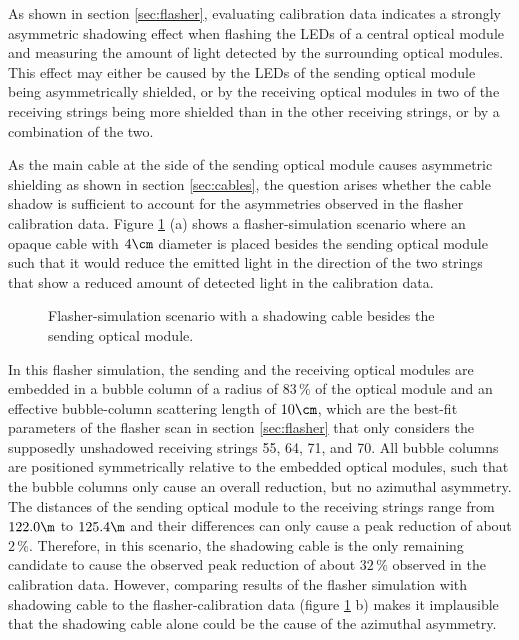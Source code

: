 As shown in section \ref{sec:flasher}, evaluating calibration data indicates a strongly asymmetric shadowing effect when flashing the LEDs of a central optical module and measuring the amount of light detected by the surrounding optical modules. This effect may either be caused by the LEDs of the sending optical module being asymmetrically shielded, or by the receiving optical modules in two of the receiving strings being more shielded than in the other receiving strings, or by a combination of the two.

As the main cable at the side of the sending optical module causes asymmetric shielding as shown in section \ref{sec:cables}, the question arises whether the cable shadow is sufficient to account for the asymmetries observed in the flasher calibration data. Figure \ref{fig:neen7Noo} (a) shows a flasher-simulation scenario where an opaque cable with $4\cm$ diameter is placed besides the sending optical module such that it would reduce the emitted light in the direction of the two strings that show a reduced amount of detected light in the calibration data.

\begin{figure}[htbp]
  \hfill
  \caption{Flasher-simulation scenario with a shadowing cable besides the sending optical module.}
  \label{fig:neen7Noo}
\end{figure}


In this flasher simulation, the sending and the receiving optical modules are embedded in a bubble column of a radius of $83\,\%$ of the optical module and an effective bubble-column scattering length of $10\cm$, which are the best-fit parameters of the flasher scan in section \ref{sec:flasher} that only considers the supposedly unshadowed receiving strings 55, 64, 71, and 70. All bubble columns are positioned symmetrically relative to the embedded optical modules, such that the bubble columns only cause an overall reduction, but no azimuthal asymmetry. The distances of the sending optical module to the receiving strings range from $122.0\m$ to $125.4\m$ and their differences can only cause a peak reduction of about $2\,\%$.
Therefore, in this scenario, the shadowing cable is the only remaining candidate to cause the observed peak reduction of about $32\,\%$ observed in the calibration data.
However, comparing results of the flasher simulation with shadowing cable to the flasher-calibration data (figure \ref{fig:neen7Noo} b) makes it implausible that the shadowing cable alone could be the cause of the azimuthal asymmetry.


